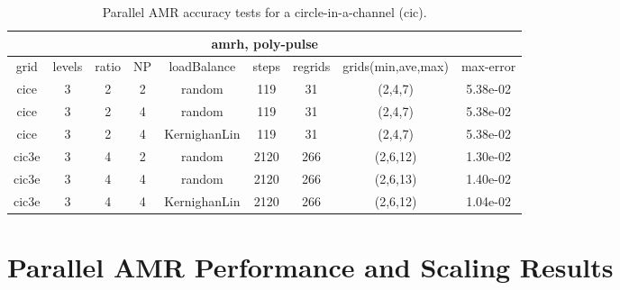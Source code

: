 \begin{table}[hbt]
\begin{center}\footnotesize
\begin{tabular}{|c|c|c|c|c|c|c|c|c|} \hline 
 \multicolumn{9}{|c|}{amrh, poly-pulse} \\\hline
  grid    & levels & ratio &  NP  &  loadBalance &  steps & regrids & grids(min,ave,max) & max-error \\ \hline
cice      &    3   &  2   &  2  & random        & 119  & 31    & (2,4,7) & 5.38e-02 \\
cice      &    3   &  2   &  4  & random        & 119  & 31    & (2,4,7) & 5.38e-02 \\
cice      &    3   &  2   &  4  & KernighanLin  & 119  & 31    & (2,4,7) & 5.38e-02 \\
\hline
cic3e     &    3   &  4   &  2  & random        & 2120  & 266    & (2,6,12) & 1.30e-02 \\
cic3e     &    3   &  4   &  4  & random        & 2120  & 266    & (2,6,13) & 1.40e-02 \\
cic3e     &    3   &  4   &  4  & KernighanLin  & 2120  & 266    & (2,6,12) & 1.04e-02 \\
\hline
\end{tabular}		
\end{center}		
\caption{Parallel AMR accuracy tests for a circle-in-a-channel (cic).}
 \label{tab:parallelAccuracySquare} 
\end{table}








\clearpage
\section{Parallel AMR Performance and Scaling Results}\label{sec:parallelPerformance}




